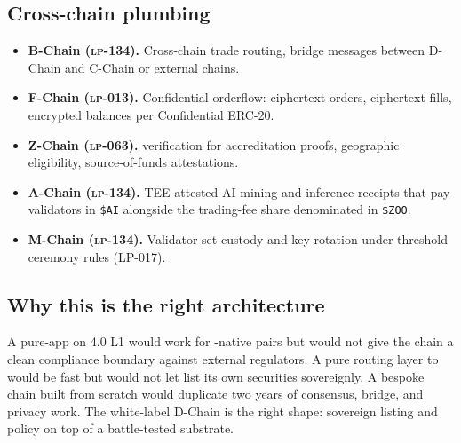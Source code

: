 \subsection{Cross-chain plumbing}

\begin{itemize}[leftmargin=1.2em]
  \item \textbf{B-Chain (\textsc{lp-134}).} Cross-chain trade routing,
        bridge messages between \Zoo{} D-Chain and \Lux{} C-Chain or
        external chains.
  \item \textbf{F-Chain (\textsc{lp-013}).} Confidential orderflow:
        ciphertext orders, ciphertext fills, encrypted balances per
        Confidential ERC-20.
  \item \textbf{Z-Chain (\textsc{lp-063}).} \ZKP{} verification for
        accreditation proofs, geographic eligibility, source-of-funds
        attestations.
  \item \textbf{A-Chain (\textsc{lp-134}).} TEE-attested AI mining and
        inference receipts that pay validators in \texttt{\$AI}
        alongside the trading-fee share denominated in
        \texttt{\$ZOO}.
  \item \textbf{M-Chain (\textsc{lp-134}).} Validator-set custody and
        key rotation under \Lux{} threshold ceremony rules (LP-017).
\end{itemize}

\subsection{Why this is the right architecture}

A pure-app \DEX{} on \Zoo{} 4.0 L1 would work for \Zoo{}-native pairs
but would not give the chain a clean compliance boundary against
external regulators. A pure routing layer to \Lux{} \DEX{} would be
fast but would not let \Zoo{} list its own securities sovereignly.
A bespoke chain built from scratch would duplicate two years of
\Lux{} consensus, bridge, and privacy work. The white-label D-Chain
is the right shape: sovereign listing and policy on top of a battle-tested
\Lux{} substrate.
